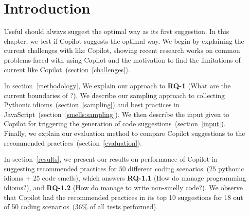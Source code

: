 \label{chapter:methodology}

\section{Introduction}
Useful \cct{} should always suggest the optimal way as its first suggestion. In this chapter, we test if Copilot suggests the optimal way. 
We begin by explaining the current challenges with \cct{} like Copilot, showing recent research works on common problems faced with using Copilot and the motivation to find the limitations of current \cct{} like Copilot~(section~\ref{challenges}).

In section~\ref{methodology}, We explain our approach to \textbf{RQ-1} (What are the current boundaries of \cct{}?). 
We describe our sampling approach to collecting Pythonic idioms~(section~\ref{sampling}) and best practices in JavaScript~(section~\ref{smells:sampling}). We then describe the input given to Copilot for triggering the generation of code suggestions~(section~\ref{input}).
Finally, we explain our evaluation method to compare Copilot suggestions to the recommended practices~(section~\ref{evaluation}).

In section~\ref{results}, we present our results on performance of Copilot in suggesting recommended practices for 50 different coding scenarios~(25 pythonic idioms + 25 code smells), which answers \textbf{RQ-1.1} (How do \cct{} manage programming idioms?), and \textbf{RQ-1.2} (How do \cct{} manage to write non-smelly code?).
We observe that Copilot had the recommended practices in its top 10 suggestions for 18 out of 50 coding scenarios~(36\% of all tests performed).



